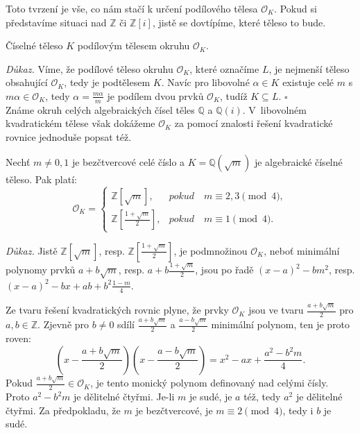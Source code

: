 \documentclass[12pt]{report}
\begin{document}
Toto tvrzení je vše, co nám stačí k určení podílového tělesa $\mathcal{O}_K$. Pokud si představíme situaci nad $\mathbb{Z}$ či $\mathbb{Z}[i]$, jistě se dovtípíme, které těleso to bude.

\begin{dusledek}
Číselné těleso $K$ podílovým tělesem okruhu $\mathcal{O}_K$. 
\end{dusledek}
\noindent \textit{Důkaz.} Víme, že podílové těleso okruhu $\mathcal{O}_K$, které označíme $L$, je nejmenší těleso obsahující $\mathcal{O}_K$, tedy je podtělesem $K$. Navíc pro libovolné $\alpha \in K$ existuje celé $m$ s $m \alpha \in \mathcal{O}_K$, tedy $\alpha = \frac{m \alpha}{m}$ je podílem dvou prvků $\mathcal{O}_K$, tudíž $K \subseteq L$. \hfill $\square$\\

Známe okruh celých algebraických čísel těles $\mathbb{Q}$ a $\mathbb{Q}(i)$. V~libovolném kvadratickém tělese však dokážeme $\mathcal{O}_K$ za pomocí znalosti řešení kvadratické rovnice jednoduše popsat též.

 \begin{veta}\label{cela}
Nechť $m \neq 0,1$ je bezčtvercové celé číslo a $K = \mathbb{Q}(\sqrt{m})$ je algebraické číselné těleso. Pak platí:
\begin{equation*}
\mathcal{O}_K = \begin{cases}
      \mathbb{Z}[\sqrt{m}], & \textit{pokud} \quad  m \equiv 2,3 \pmod{4},\\
      \mathbb{Z}\left[\frac{1+\sqrt{m}}{2}\right], & \textit{pokud} \quad m \equiv 1 \pmod{4}.
    \end{cases}
\end{equation*}
\end{veta}

\noindent \textit{Důkaz.} Jistě $\mathbb{Z}[\sqrt{m}]$, resp. $\mathbb{Z}\left[\frac{1+\sqrt{m}}{2}\right]$, je podmnožinou $\mathcal{O}_K$, neboť minimální polynomy prvků $a+b\sqrt{m}$, resp. $a+b\frac{1+\sqrt{m}}{2}$, jsou po řadě $(x-a)^2 - b m^2$, resp. $(x-a)^2 - bx + ab + b^2 \frac{1-m}{4}$.

Ze tvaru řešení kvadratických rovnic plyne, že prvky $\mathcal{O}_K$ jsou ve tvaru $\frac{a+b\sqrt{m}}{2}$ pro $a,b \in \mathbb{Z}$. Zjevně pro $b \neq 0$ sdílí $\frac{a+b\sqrt{m}}{2}$ a $\frac{a-b\sqrt{m}}{2}$ minimální polynom, ten je proto roven:
\begin{equation*}
\left(x - \frac{a+b\sqrt{m}}{2} \right)\left( x - \frac{a-b\sqrt{m}}{2}\right) = x^2 - ax + \frac{a^2 - b^2 m}{4}.
\end{equation*} 
Pokud $\frac{a+b\sqrt{m}}{2} \in \mathcal{O}_K$, je tento monický polynom definovaný nad celými čísly. Proto $a^2 - b^2 m$ je dělitelné čtyřmi. Je-li $m$ je sudé, je $a$ též, tedy $a^2 $ je dělitelné čtyřmi. Za předpokladu, že $m$ je bezčtvercové, je $m \equiv 2 \pmod{4}$, tedy i $b$ je sudé.
\end{document}
